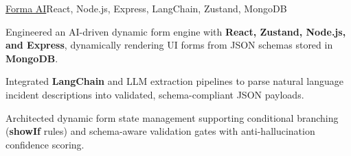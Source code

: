 \begin{cvproject}{\uline{Forma AI}}{React, Node.js, Express, LangChain, Zustand, MongoDB}
    \item Engineered an AI-driven dynamic form engine with \textbf{React, Zustand, Node.js, and Express}, dynamically rendering UI forms from JSON schemas stored in \textbf{MongoDB}.
    \item Integrated \textbf{LangChain} and LLM extraction pipelines to parse natural language incident descriptions into validated, schema-compliant JSON payloads.
    \item Architected dynamic form state management supporting conditional branching (\textbf{showIf} rules) and schema-aware validation gates with anti-hallucination confidence scoring.
\end{cvproject}

